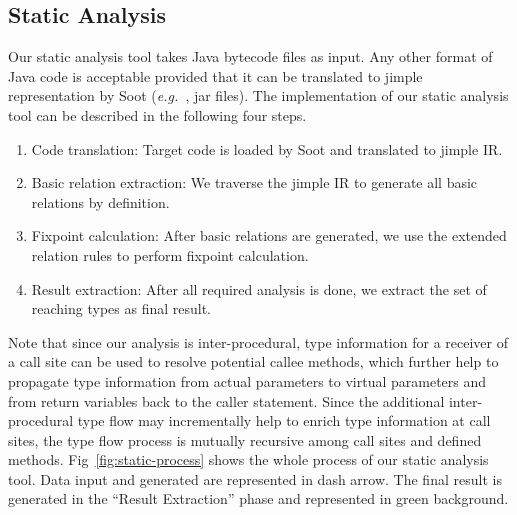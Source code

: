 \documentclass{fac}
\newcommand\eg{\textit{e.g.\ }}
\begin{document}

\subsection{Static Analysis}\label{subsec:static-analysis-tool}
Our static analysis tool %
takes Java bytecode files as input. Any other format of Java code is acceptable provided that it can be translated to jimple representation by Soot (\eg, jar files). The implementation of our static analysis tool can be described in the following four steps. %
\begin{enumerate}
\item Code translation:
Target code is loaded by Soot and translated to jimple IR. %
\item Basic relation extraction: %
We traverse the %
jimple IR to generate all basic relations by definition.
\item Fixpoint calculation:
After basic relations are generated, we use the extended relation rules to perform fixpoint calculation.
\item Result extraction:
After all required analysis is done, we extract the set of reaching types as final result.
\end{enumerate}
Note that since our analysis is inter-procedural, type information for a receiver of a call site can be used to resolve potential callee methods, which further help to propagate type information from actual parameters to virtual parameters and from return variables back to the caller statement. Since the additional inter-procedural type flow may incrementally help to enrich type information at call sites, the type flow process is mutually recursive among call sites and defined methods. %
Fig~\ref{fig:static-process} shows the whole process of our static analysis tool. Data input and generated are represented in dash arrow. The final result is generated in the ``Result Extraction'' phase and represented in green background.
\end{document}
